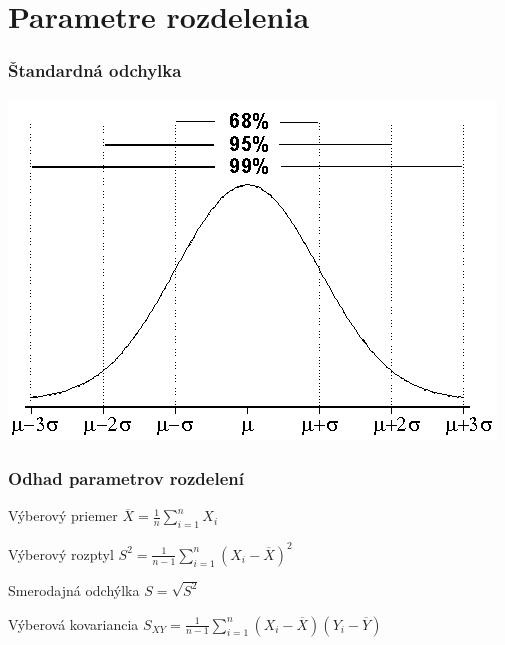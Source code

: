 \documentclass{beamer}
\begin{document}
\section{Parametre rozdelenia}


\begin{frame}
\frametitle{Štandardná odchylka}
\includegraphics[width = \textwidth]{df3.png}
\end{frame}

\begin{frame}
\frametitle{Odhad parametrov rozdelení}

\begin{block}{Výberový priemer}
$ \overline{X} = \frac{1}{n} \sum_{i=1}^n X_i $
\end{block}

\begin{block}{Výberový rozptyl}
$ S^2 = \frac{1}{n-1} \sum_{i=1}^n (X_i - \overline{X})^2 $
\end{block}


\begin{block}{Smerodajná odchýlka}
$S = \sqrt{S^2}$
\end{block}

\begin{block}{Výberová kovariancia}
$S_{XY} = \frac{1}{n-1} \sum_{i=1}^n (X_i - \overline{X})(Y_i - \overline{Y}) $
\end{block}
\end{frame}
\end{document}
